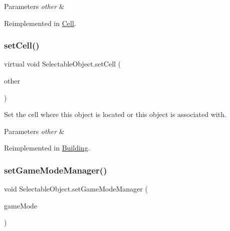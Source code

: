 \begin{DoxyParams}{Parameters}
{\em other} & \\
\hline
\end{DoxyParams}


Reimplemented in \mbox{\hyperlink{class_cell_a415c2fd77ec3b53bed8115fddd311a6f}{Cell}}.

\mbox{\label{class_selectable_object_a8d56c05598d677cca9c8b06a774ee5a2}} 
\subsubsection{\texorpdfstring{set\+Cell()}{setCell()}}
{\footnotesize\ttfamily virtual void Selectable\+Object.\+set\+Cell (\begin{DoxyParamCaption}\item[{\mbox{\hyperlink{class_selectable_object}{Selectable\+Object}}}]{other }\end{DoxyParamCaption})\hspace{0.3cm}{\ttfamily [virtual]}}



Set the cell where this object is located or this object is associated with. 


\begin{DoxyParams}{Parameters}
{\em other} & \\
\hline
\end{DoxyParams}


Reimplemented in \mbox{\hyperlink{class_building_a81f0e7df4171d3508afefe8deac1eea6}{Building}}.

\mbox{\label{class_selectable_object_a049896cdcfa8970062bf5a5cb38b570b}} 
\subsubsection{\texorpdfstring{set\+Game\+Mode\+Manager()}{setGameModeManager()}}
{\footnotesize\ttfamily void Selectable\+Object.\+set\+Game\+Mode\+Manager (\begin{DoxyParamCaption}\item[{\mbox{\hyperlink{class_player}{Player}}}]{game\+Mode }\end{DoxyParamCaption})}



